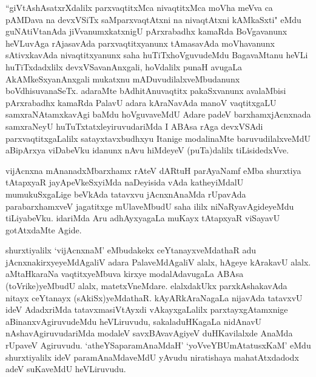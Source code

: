 \begin{artha}
``giVtAshAsatxrXdalilx parxvaqtitxMca nivaqtitxMca moVha meVva ca pAMDava na devxVSiTx saMparxvaqtAtxni na nivaqtAtxni kAMkaSxti" eMdu guNAtiVtanAda jiVvanumxkatxnigU pArxrabadhx kamaRda BoVgavanunx heVLuvAga rAjasavAda parxvaqtitxyanunx tAmasavAda moVhavanunx sAtivxkavAda nivaqtitxyanunx saha huTiTxhoVguvudeMdu BagavaMtanu heVLi huTiTxdadxlilx devxVSavanAnxgali, hoVdalilx punaH avugaLa AkAMkeSxyanAnxgali mukatxnu mADuvudilalxveMbudanunx boVdhisuvanaSeTx. adaraMte bAdhitAnuvaqtitx pakaSxvanunx avalaMbisi pArxrabadhx kamaRda PalavU adara kAraNavAda manoV vaqtitxgaLU samxraNAtamxkavAgi baMdu hoVguvaveMdU Adare padeV barxhamxjAcnxnada samxraNeyU huTuTxtatxleyiruvudariMda I ABAsa rAga devxVSAdi parxvaqtitxgaLalilx satayxtavxbudhxyu Itanige modalinaMte baruvudilalxveMdU aBipArxya viDabeVku idanunx nAvu hiMdeyeV (puTa)dalilx tiLisidedxVve. 
\end{artha}%

\begin{artha}
vijAcnxna mAnanadxMbarxhamx rAteV dARtuH parAyaNamf eMba shurxtiya tAtapxyaR jayApeVkeSxyiMda naDeyisida vAda katheyiMdalU mumukuSxgaLige beVkAda tatavxvu jAcnxnAnaMda rUpavAda parabarxhamxveV jagatitxge mUlaveMbudU saha ililx niNaRyavAgideyeMdu tiLiyabeVku. idariMda Aru adhAyxyagaLa muKayx tAtapxyaR viSayavU gotAtxdaMte Agide. 
\end{artha}

\begin{artha}
shurxtiyalilx `vijAcnxnaM' eMbudakekx ceYtanayxveMdathaR adu jAcnxnakirxyeyeMdAgaliV adara PalaveMdAgaliV alalx, hAgeye kArakavU alalx. aMtaHkaraNa vaqtitxyeMbuva kirxye modalAdavugaLa ABAsa (toVrike)yeMbudU alalx, matetxVneMdare. elalxdakUkx parxkAshakavAda nitayx ceYtanayx (sAkiSx)yeMdathaR. kAyARkAraNagaLa nijavAda tatavxvU ideV AdadxriMda tatavxmasiVtAyxdi vAkayxgaLalilx parxtayxgAtamxnige aBinanxvAgiruvudeMdu heVLiruvudu, sakaladuHKagaLa nidAnavU nAshavAgiruvudariMda modaleV savxBAvavAgiyeV duHKavilalxde AnaMda rUpaveV Agiruvudu. `atheYSaparamAnaMdaH' `yoVveYBUmAtatusxKaM' eMdu shurxtiyalilx ideV paramAnaMdaveMdU yAvudu niratishaya mahatAtxdadodx adeV suKaveMdU heVLiruvudu.
\end{artha}%

